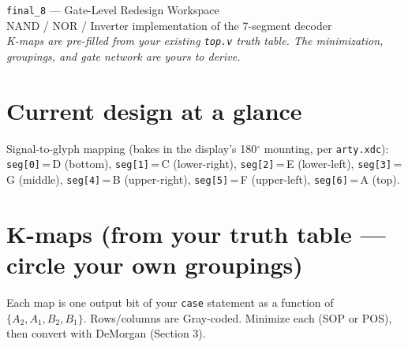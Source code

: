 \documentclass[11pt]{article}
\begin{document}
\begin{center}
{\LARGE \texttt{final\_8} --- Gate-Level Redesign Workspace}\\[4pt]
{\large NAND / NOR / Inverter implementation of the 7-segment decoder}\\[2pt]
\textit{K-maps are pre-filled from your existing \texttt{top.v} truth table.
The minimization, groupings, and gate network are yours to derive.}
\end{center}

\section{Current design at a glance}

\begin{center}
\end{center}

Signal-to-glyph mapping (bakes in the display's 180$^\circ$ mounting, per \texttt{arty.xdc}):
\texttt{seg[0]}\,=\,D (bottom), \texttt{seg[1]}\,=\,C (lower-right), \texttt{seg[2]}\,=\,E (lower-left),
\texttt{seg[3]}\,=\,G (middle), \texttt{seg[4]}\,=\,B (upper-right), \texttt{seg[5]}\,=\,F (upper-left),
\texttt{seg[6]}\,=\,A (top).

\section{K-maps (from your truth table --- circle your own groupings)}

Each map is one output bit of your \texttt{case} statement as a function of
$\{A_2, A_1, B_2, B_1\}$. Rows/columns are Gray-coded. Minimize each (SOP or POS),
then convert with DeMorgan (Section 3).
\end{document}
